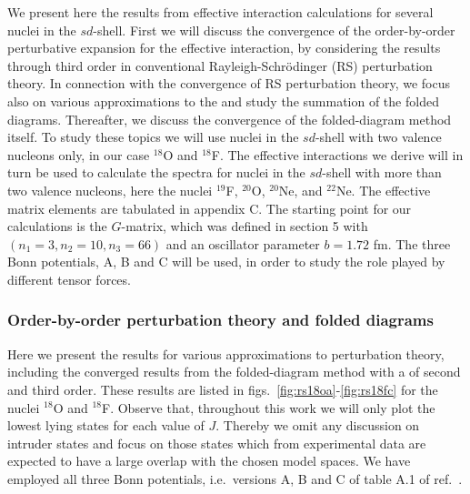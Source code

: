We present here
the results from effective interaction calculations for several
nuclei in the $sd$-shell.
First we will discuss the convergence of the order-by-order
perturbative expansion for the effective interaction, by considering
the results through third order in conventional Rayleigh-Schr\"{o}dinger (RS)
perturbation theory. In connection with the convergence of RS perturbation
theory,
we focus also on various approximations to the \qbox and study
the summation of the folded diagrams. Thereafter, we discuss the
convergence of the folded-diagram method itself. To study these
topics we will use nuclei in the $sd$-shell with two valence
nucleons only, in our case $^{18}$O and $^{18}$F. The effective
interactions we derive will in turn be used to calculate the
spectra for nuclei in the $sd$-shell with more than two
valence nucleons, here the nuclei $^{19}$F,
$^{20}$O, $^{20}$Ne,
and $^{22}$Ne. The effective matrix elements
are tabulated in appendix C.
The starting point for our calculations is the $G$-matrix, which
was defined in section 5 with
$(n_1=3, n_2=10, n_3 =66)$ and an oscillator parameter
$b=1.72$ fm. The three Bonn potentials, A, B and C will be used,
in order to study the role played by different tensor forces.


\subsubsection{Order-by-order perturbation theory and folded diagrams}

Here we present the results for various approximations to perturbation
theory, including the converged results from the folded-diagram
method with a \qbox of second and third order. These results are listed
in figs.\ \ref{fig:rs18oa}-\ref{fig:rs18fc} for the nuclei $^{18}$O and
$^{18}$F. Observe that, throughout this work we will only plot
the lowest lying states for each value of $J$. Thereby we omit
any discussion on intruder states and focus on those states which
from experimental data are expected to have a large overlap
with the  chosen model spaces.
We have employed all three Bonn potentials, i.e.\
versions A, B and C of table A.1 of ref.\ \cite{mac89}.

